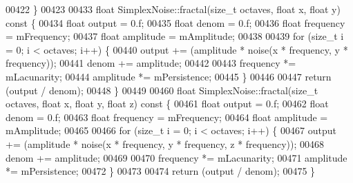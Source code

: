 \begin{DoxyCode}
00422 \}
00423 
00433 \textcolor{keywordtype}{float} SimplexNoise::fractal(\textcolor{keywordtype}{size\_t} octaves, \textcolor{keywordtype}{float} x, \textcolor{keywordtype}{float} y)\textcolor{keyword}{ const }\{
00434     \textcolor{keywordtype}{float} output = 0.f;
00435     \textcolor{keywordtype}{float} denom  = 0.f;
00436     \textcolor{keywordtype}{float} frequency = mFrequency;
00437     \textcolor{keywordtype}{float} amplitude = mAmplitude;
00438 
00439     \textcolor{keywordflow}{for} (\textcolor{keywordtype}{size\_t} i = 0; i < octaves; i++) \{
00440         output += (amplitude * noise(x * frequency, y * frequency));
00441         denom += amplitude;
00442 
00443         frequency *= mLacunarity;
00444         amplitude *= mPersistence;
00445     \}
00446 
00447     \textcolor{keywordflow}{return} (output / denom);
00448 \}
00449 
00460 \textcolor{keywordtype}{float} SimplexNoise::fractal(\textcolor{keywordtype}{size\_t} octaves, \textcolor{keywordtype}{float} x, \textcolor{keywordtype}{float} y, \textcolor{keywordtype}{float} z)\textcolor{keyword}{ const }\{
00461     \textcolor{keywordtype}{float} output = 0.f;
00462     \textcolor{keywordtype}{float} denom  = 0.f;
00463     \textcolor{keywordtype}{float} frequency = mFrequency;
00464     \textcolor{keywordtype}{float} amplitude = mAmplitude;
00465 
00466     \textcolor{keywordflow}{for} (\textcolor{keywordtype}{size\_t} i = 0; i < octaves; i++) \{
00467         output += (amplitude * noise(x * frequency, y * frequency, z * frequency));
00468         denom += amplitude;
00469 
00470         frequency *= mLacunarity;
00471         amplitude *= mPersistence;
00472     \}
00473 
00474     \textcolor{keywordflow}{return} (output / denom);
00475 \}
\end{DoxyCode}
